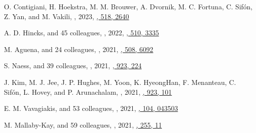 \begin{etaremune}
\item
O. Contigiani, H. Hoekstra, M. M. Brouwer, A. Dvornik, M. C. Fortuna, C. Sifón, Z. Yan, and M. Vakili,
,
2023, \href{https://ui.adsabs.harvard.edu/abs/2023MNRAS.518.2640C}{\mnras, 518, 2640}

\item
A. D. Hincks, and 45 colleagues,
,
2022, \href{https://ui.adsabs.harvard.edu/abs/2022MNRAS.510.3335H}{\mnras, 510, 3335}

\item
M. Aguena, and 24 colleagues,
,
2021, \href{https://ui.adsabs.harvard.edu/abs/2021MNRAS.508.6092A}{\mnras, 508, 6092}

\item
S. Naess, and 39 colleagues,
,
2021, \href{https://ui.adsabs.harvard.edu/abs/2021ApJ...923..224N}{\apj, 923, 224}

\item
J. Kim, M. J. Jee, J. P. Hughes, M. Yoon, K. HyeongHan, F. Menanteau, C. Sifón, L. Hovey, and P. Arunachalam,
,
2021, \href{https://ui.adsabs.harvard.edu/abs/2021ApJ...923..101K}{\apj, 923, 101}

\item
E. M. Vavagiakis, and 53 colleagues,
,
2021, \href{https://ui.adsabs.harvard.edu/abs/2021PhRvD.104d3503V}{\prd, 104, 043503}

\item
M. Mallaby-Kay, and 59 colleagues,
,
2021, \href{https://ui.adsabs.harvard.edu/abs/2021ApJS..255...11M}{\apjs, 255, 11}


\end{etaremune}

